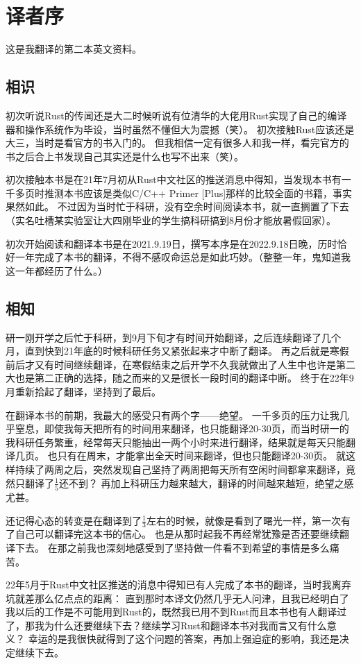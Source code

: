 \chapter{译者序}
这是我翻译的第二本英文资料。

\section*{相识}
初次听说Rust的传闻还是大二时候听说有位清华的大佬用Rust实现了自己的编译器和操作系统作为毕设，当时虽然不懂但大为震撼（笑）。
初次接触Rust应该还是大三，当时是看官方的书入门的。
但我相信一定有很多人和我一样，看完官方的书之后合上书发现自己其实还是什么也写不出来（笑）。

初次接触本书是在21年7月初从Rust中文社区的推送消息中得知，当发现本书有一千多页时推测本书应该是类似C/C++ Primer [Plus]那样的比较全面的书籍，事实果然如此。
不过因为当时忙于科研，没有空余时间阅读本书，就一直搁置了下去（实名吐槽某实验室让大四刚毕业的学生搞科研搞到8月份才能放暑假回家）。

初次开始阅读和翻译本书是在2021.9.19日，撰写本序是在2022.9.18日晚，历时恰好一年完成了本书的翻译，不得不感叹命运总是如此巧妙。（整整一年，鬼知道我这一年都经历了什么。）

\section*{相知}
研一刚开学之后忙于科研，到9月下旬才有时间开始翻译，之后连续翻译了几个月，直到快到21年底的时候科研任务又紧张起来才中断了翻译。
再之后就是寒假前后才又有时间继续翻译，在寒假结束之后开学不久我就做出了人生中也许是第二大也是第二正确的选择，随之而来的又是很长一段时间的翻译中断。
终于在22年9月重新拾起了翻译，坚持到了最后。

在翻译本书的前期，我最大的感受只有两个字——绝望。
一千多页的压力让我几乎窒息，即使我每天把所有的时间用来翻译，也只能翻译20-30页，而当时研一的我科研任务繁重，经常每天只能抽出一两个小时来进行翻译，结果就是每天只能翻译几页。
也只有在周末，才能拿出全天时间来翻译，但也只能翻译20-30页。
就这样持续了两周之后，突然发现自己坚持了两周把每天所有空闲时间都拿来翻译，竟然只翻译了$\frac{1}{5}$还不到？
再加上科研压力越来越大，翻译的时间越来越短，绝望之感尤甚。

还记得心态的转变是在翻译到了$\frac{1}{3}$左右的时候，就像是看到了曙光一样，第一次有了自己可以翻译完这本书的信心。
也是从那时起我不再经常犹豫是否还要继续翻译下去。
在那之前我也深刻地感受到了坚持做一件看不到希望的事情是多么痛苦。

22年5月于Rust中文社区推送的消息中得知已有人完成了本书的翻译，当时我离弃坑就差那么亿点点的距离：
直到那时本译文仍然几乎无人问津，且我已经明白了我以后的工作是不可能用到Rust的，既然我已用不到Rust而且本书也有人翻译过了，那我为什么还要继续下去？继续学习Rust和翻译本书对我而言又有什么意义？
幸运的是我很快就得到了这个问题的答案，再加上强迫症的影响，我还是决定继续下去。

